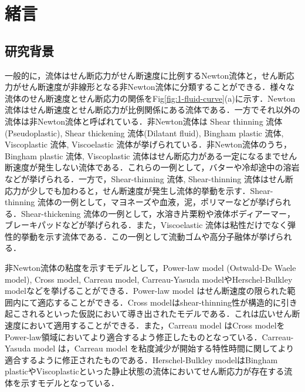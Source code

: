 \section{緒言}

\subsection{研究背景}

一般的に，流体はせん断応力がせん断速度に比例するNewton流体と，せん断応力がせん断速度が非線形となる非Newton流体に分類することができる．様々な流体のせん断速度とせん断応力の関係をFig\ref{fig:1-fluid-curve}(a)に示す\cite{ref:1}．Newton流体はせん断速度とせん断応力が比例関係にある流体である．一方でそれ以外の流体は非Newton流体と呼ばれている．非Newton流体は Shear thinning 流体(Pseudoplastic), Shear thickening 流体(Dilatant fluid), Bingham plastic 流体, Viscoplastic 流体, Viscoelastic 流体が挙げられている．非Newton流体のうち，Bingham plastic 流体, Viscoplastic 流体はせん断応力がある一定になるまでせん断速度が発生しない流体である．これらの一例として，バターや冷却途中の溶岩などが挙げられる\cite{mendes2004viscosity,balmforth2000visco}．一方で，Shear-thinning 流体, Shear-thinning 流体はせん断応力が少しでも加わると，せん断速度が発生し流体的挙動を示す．Shear-thinning 流体の一例として，マヨネーズや血液，泥，ポリマーなどが挙げられる\cite{liu2007rheological,bodnar2011shear,hu2017shear,ryder2006shear}．Shear-thickening 流体の一例として，水溶き片栗粉や液体ボディアーマー，ブレーキパッドなどが挙げられる\cite{crawford2013shear,haris2017effectiveness,zarei2020application}．また，Viscoelastic 流体は粘性だけでなく弾性的挙動を示す流体である．この一例として流動ゴムや高分子融体が挙げられる\cite{stieger2021influence,boger1987viscoelastic}．

非Newton流体の粘度を示すモデルとして，Power-law model (Ostwald-De Waele model)\cite{Ostwald1929}, Cross model\cite{cross1965rheology}, Carreau model\cite{carreau1972rheological}, Carreau-Yasuda model\cite{yasuda1979investigation}やHerschel-Bulkley model\cite{briscoe1994properties,de1998fresh}などを挙げることができる\cite{ref:1}．Power-law model はせん断速度の限られた範囲内にて適応することができる．Cross modelはshear-thinning性が構造的に引き起こされるといった仮説において導き出されたモデルである．これは広いせん断速度において適用することができる．また，Carreau model はCross modelをPower-law領域においてより適合するよう修正したものとなっている．Carreau-Yasuda model は，Carreau model を粘度減少が開始する特性時間に関してより適合するように修正されたものである．Herschel-Bulkley modelはBingham plasticやViscoplasticといった静止状態の流体においてせん断応力が存在する流体を示すモデルとなっている\cite{ref:1}．

